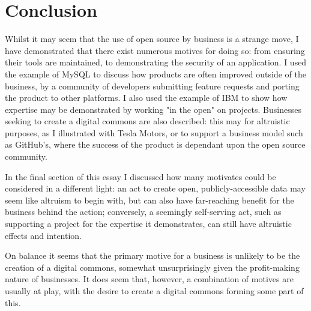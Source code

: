 \documentclass[a4paper]{article}
\begin{document}
\section{Conclusion}

Whilst it may seem that the use of open source by business is a strange move, I have demonstrated that there exist numerous motives for doing so: from ensuring their tools are maintained, to demonstrating the security of an application. I used the example of MySQL to discuss how products are often improved outside of the business, by a community of developers submitting feature requests and porting the product to other platforms. I also used the example of IBM to show how expertise may be demonstrated by working "in the open" on projects. Businesses seeking to create a digital commons are also described: this may for altruistic purposes, as I illustrated with Tesla Motors, or to support a business model such as GitHub's, where the success of the product is dependant upon the open source community.

In the final section of this essay I discussed how many motivates could be considered in a different light: an act to create open, publicly-accessible data may seem like altruism to begin with, but can also have far-reaching benefit for the business behind the action; conversely, a seemingly self-serving act, such as supporting a project for the expertise it demonstrates, can still have altruistic effects and intention.

On balance it seems that the primary motive for a business is unlikely to be the creation of a digital commons, somewhat unsurprisingly given the profit-making nature of businesses. It does seem that, however, a combination of motives are usually at play, with the desire to create a digital commons forming some part of this.


\end{document}

